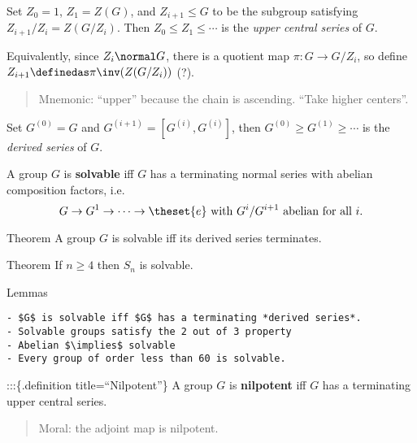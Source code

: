 \begin{definition}

Set \(Z_0 = 1\), \(Z_1 = Z(G)\), and \(Z_{i+1} \leq G\) to be the
subgroup satisfying \(Z_{i+1}/Z_i = Z(G/Z_i)\). Then
\(Z_0 \leq Z_1 \leq \cdots\) is the \emph{upper central series} of
\(G\).

Equivalently, since \(Z_i\normal G\), there is a quotient map
\(\pi:G\to G/Z_i\), so define \(Z_{i+1} \definedas \pi\inv(Z(G/Z_i))\)
(?).

\begin{quote}
Mnemonic: ``upper'' because the chain is ascending. ``Take higher
centers''.
\end{quote}

\end{definition}

\begin{definition}

Set \(G^{(0)} = G\) and \(G^{(i+1)} = [G^{(i)}, G^{(i)}]\), then
\(G^{(0)} \geq G^{(1)} \geq \cdots\) is the \emph{derived series} of
\(G\).

\end{definition}

\begin{definition}[Solvable]

A group \(G\) is \textbf{solvable} iff \(G\) has a terminating normal
series with abelian composition factors, i.e. \[
  G \to G^1 \to \cdots \to \theset{e} \text{ with } G^{i}/G^{i+1}\text{ abelian for all } i
  .\]

\end{definition}

Theorem A group \(G\) is solvable iff its derived series terminates.

Theorem If \(n\geq 4\) then \(S_n\) is solvable.

Lemmas \hfill

\begin{verbatim}
- $G$ is solvable iff $G$ has a terminating *derived series*.
- Solvable groups satisfy the 2 out of 3 property
- Abelian $\implies$ solvable
- Every group of order less than 60 is solvable.
\end{verbatim}

:::\{.definition title=``Nilpotent''\} A group \(G\) is
\textbf{nilpotent} iff \(G\) has a terminating upper central series.

\begin{quote}
Moral: the adjoint map is nilpotent.
\end{quote}

